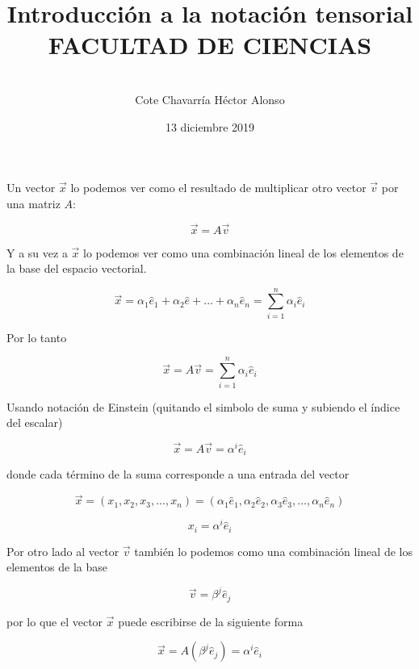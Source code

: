 \documentclass[12pt]{article}
\title{\textbf{Introducción a la notación tensorial
\\\large FACULTAD DE CIENCIAS}}
\author{\\
Cote Chavarr\'ia H\'ector Alonso}
\date{13 diciembre 2019}
\numberwithin{equation}{section}
\begin{document}
\maketitle

Un vector $\vec{x}$ lo podemos ver como el resultado de multiplicar otro vector $\vec{v}$ por una matriz $A$:

\begin{equation}
\vec{x}= A\vec{v}
\end{equation}

Y a su vez a $\vec{x}$ lo podemos ver como una combinación lineal de los elementos de la base del espacio vectorial.


\begin{equation}
\vec{x} = \alpha_1\hat{e}_1 + \alpha_2\hat{e} + ... + \alpha_n\hat{e}_n = \sum_{i=1}^n \alpha_i \hat{e}_i
\end{equation}

Por lo tanto

\begin{equation}
\vec{x}= A\vec{v}= \sum_{i=1}^n \alpha_i \hat{e}_i
\end{equation}

Usando notación de Einstein (quitando el simbolo de suma y  subiendo el índice del escalar)

\begin{equation}
\vec{x}= A\vec{v}= \alpha^i \hat{e}_i
\end{equation}

donde cada término de la suma corresponde a una entrada del vector 

\begin{equation}
\vec{x}=(x_1,x_2,x_3, ... ,x_n)=(\alpha_1\hat{e}_1, \alpha_2\hat{e}_2, \alpha_3\hat{e}_3,...,\alpha_n\hat{e}_n)
\end{equation}


\begin{equation}
x_i= \alpha^i \hat{e}_i
\end{equation}


Por otro lado al vector $\vec{v}$ también lo podemos como una combinación lineal de los elementos de la base

\begin{equation}
\vec{v}=\beta^j \hat{e}_j
\end{equation}

por lo que el vector $\vec{x}$ puede escribirse de la siguiente forma


\begin{equation}
\vec{x}= A({\beta^j \hat{e}_j})= \alpha^i \hat{e}_i
\end{equation}
\end{document}
